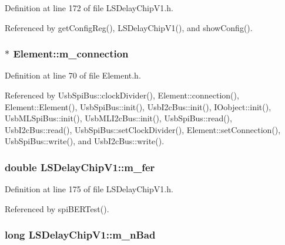 Definition at line 172 of file LSDelayChipV1.h.

Referenced by getConfigReg(), LSDelayChipV1(), and showConfig().\hypertarget{classElement_abe3de7a5dbbc9a6dd2d7e012e5fdb266}{
\subsubsection[{m\_\-connection}]{$\ast$ {\bf Element::m\_\-connection}}}
\label{classElement_abe3de7a5dbbc9a6dd2d7e012e5fdb266}


Definition at line 70 of file Element.h.

Referenced by UsbSpiBus::clockDivider(), Element::connection(), Element::Element(), UsbSpiBus::init(), UsbI2cBus::init(), IOobject::init(), UsbMLSpiBus::init(), UsbMLI2cBus::init(), UsbSpiBus::read(), UsbI2cBus::read(), UsbSpiBus::setClockDivider(), Element::setConnection(), UsbSpiBus::write(), and UsbI2cBus::write().\hypertarget{classLSDelayChipV1_a38d35de6a25fb1394ede2f39a4f25a08}{
\subsubsection[{m\_\-fer}]{\setlength{\rightskip}{0pt plus 5cm}double {\bf LSDelayChipV1::m\_\-fer}}}
\label{classLSDelayChipV1_a38d35de6a25fb1394ede2f39a4f25a08}


Definition at line 175 of file LSDelayChipV1.h.

Referenced by spiBERTest().\hypertarget{classLSDelayChipV1_a425c69ef8f3d64d93cb1c86b83bbceec}{
\subsubsection[{m\_\-nBad}]{\setlength{\rightskip}{0pt plus 5cm}long {\bf LSDelayChipV1::m\_\-nBad}}}
\label{classLSDelayChipV1_a425c69ef8f3d64d93cb1c86b83bbceec}


